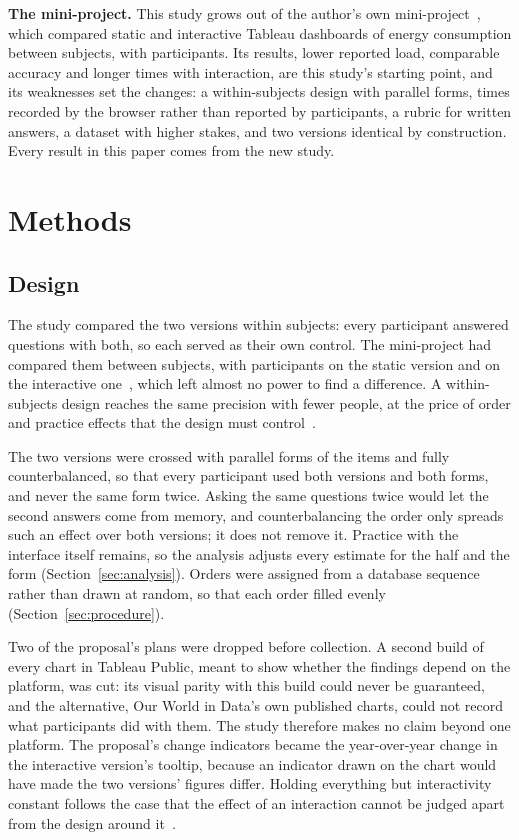 \documentclass[10pt,twocolumn]{article}
\begin{document}
\textbf{The mini-project.} This study grows out of the author's own mini-project~\cite{rebollar2026mini}, which compared static and interactive Tableau dashboards of energy consumption between subjects, with  participants. Its results, lower reported load, comparable accuracy and longer times with interaction, are this study's starting point, and its weaknesses set the changes: a within-subjects design with parallel forms, times recorded by the browser rather than reported by participants, a rubric for written answers, a dataset with higher stakes, and two versions identical by construction. Every result in this paper comes from the new study.

\section{Methods}
\label{sec:methods}

\subsection{Design}
\label{sec:design}

The study compared the two versions within subjects: every participant answered questions with both, so each served as their own control. The mini-project had compared them between subjects, with  participants on the static version and  on the interactive one~\cite{rebollar2026mini}, which left almost no power to find a difference. A within-subjects design reaches the same precision with fewer people, at the price of order and practice effects that the design must control~\cite{greenwald1976,charness2012}.

The two versions were crossed with  parallel forms of the items and fully counterbalanced, so that every participant used both versions and both forms, and never the same form twice. Asking the same questions twice would let the second answers come from memory, and counterbalancing the order only spreads such an effect over both versions; it does not remove it. Practice with the interface itself remains, so the analysis adjusts every estimate for the half and the form (Section~\ref{sec:analysis}). Orders were assigned from a database sequence rather than drawn at random, so that each order filled evenly (Section~\ref{sec:procedure}).

Two of the proposal's plans were dropped before collection. A second build of every chart in Tableau Public, meant to show whether the findings depend on the platform, was cut: its visual parity with this build could never be guaranteed, and the alternative, Our World in Data's own published charts, could not record what participants did with them. The study therefore makes no claim beyond one platform. The proposal's change indicators became the year-over-year change in the interactive version's tooltip, because an indicator drawn on the chart would have made the two versions' figures differ. Holding everything but interactivity constant follows the case that the effect of an interaction cannot be judged apart from the design around it~\cite{lam2012,dimara2019}.
\end{document}
